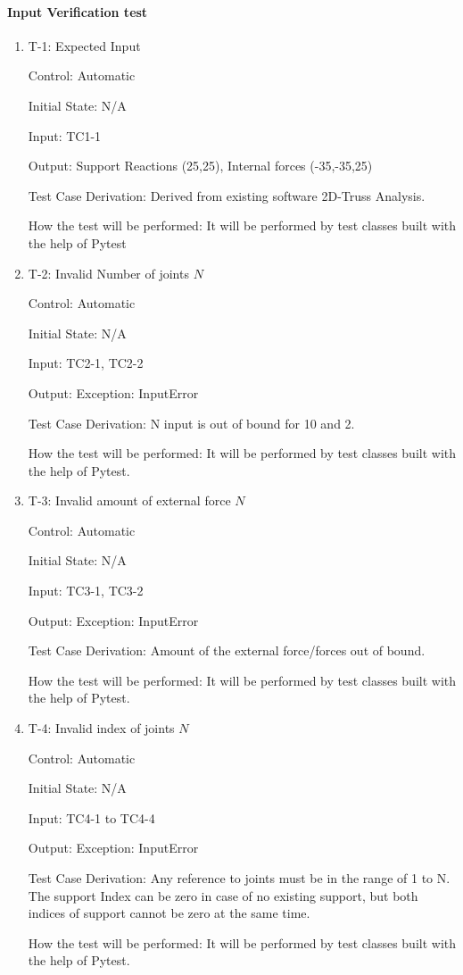 \documentclass[12pt, titlepage]{article}
\begin{document}
\paragraph{Input Verification test}

\begin{enumerate}

\item{T-1: Expected Input\\}

Control: Automatic
					
Initial State: N/A
					
Input: TC1-1
					
Output: Support Reactions (25,25), Internal forces (-35,-35,25)

Test Case Derivation: Derived from existing software 2D-Truss Analysis.
					
How the test will be performed: It will be performed by test classes built with the help of Pytest
					
\item{T-2: Invalid Number of joints $N$\\}

Control: Automatic
					
Initial State: N/A
					
Input: TC2-1, TC2-2
					
Output: Exception: InputError

Test Case Derivation: N input is out of bound for 10 and 2.

How the test will be performed: It will be performed by test classes built with the help of Pytest.
\item{T-3: Invalid amount of external force $N$\\}

Control: Automatic
					
Initial State: N/A
					
Input: TC3-1, TC3-2
					
Output: Exception: InputError

Test Case Derivation: Amount of the external force/forces out of bound. 

How the test will be performed: It will be performed by test classes built with the help of Pytest.
\item{T-4: Invalid index of joints $N$\\}

Control: Automatic
					
Initial State: N/A
					
Input: TC4-1 to TC4-4
					
Output: Exception: InputError

Test Case Derivation: Any reference to joints must be in the range of 1 to N. The support Index can be zero in case of no existing support, but both indices of support cannot be zero at the same time.

How the test will be performed: It will be performed by test classes built with the help of Pytest.


\end{enumerate}
\end{document}
